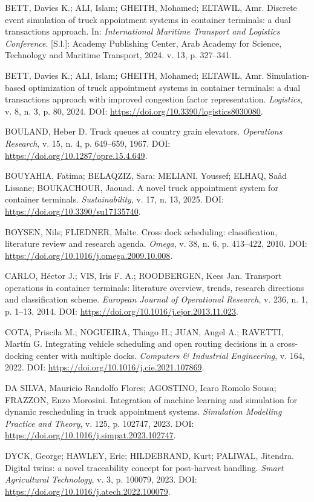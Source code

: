 \documentclass[
  12pt,
  oneside,
  a4paper,
  sumario=tradicional,
  brazil
]{abntex2}
\begin{document}
BETT, Davies K.; ALI, Islam; GHEITH, Mohamed; ELTAWIL, Amr. Discrete event simulation of truck appointment systems in container terminals: a dual transactions approach. In: \textit{International Maritime Transport and Logistics Conference}. [S.l.]: Academy Publishing Center, Arab Academy for Science, Technology and Maritime Transport, 2024. v. 13, p. 327--341.

BETT, Davies K.; ALI, Islam; GHEITH, Mohamed; ELTAWIL, Amr. Simulation-based optimization of truck appointment systems in container terminals: a dual transactions approach with improved congestion factor representation. \textit{Logistics}, v. 8, n. 3, p. 80, 2024. DOI: \url{https://doi.org/10.3390/logistics8030080}.

BOULAND, Heber D. Truck queues at country grain elevators. \textit{Operations Research}, v. 15, n. 4, p. 649--659, 1967. DOI: \url{https://doi.org/10.1287/opre.15.4.649}.

BOUYAHIA, Fatima; BELAQZIZ, Sara; MELIANI, Youssef; ELHAQ, Sa\^ad Lissane; BOUKACHOUR, Jaouad. A novel truck appointment system for container terminals. \textit{Sustainability}, v. 17, n. 13, 2025. DOI: \url{https://doi.org/10.3390/su17135740}.

BOYSEN, Nils; FLIEDNER, Malte. Cross dock scheduling: classification, literature review and research agenda. \textit{Omega}, v. 38, n. 6, p. 413--422, 2010. DOI: \url{https://doi.org/10.1016/j.omega.2009.10.008}.

CARLO, H\'ector J.; VIS, Iris F. A.; ROODBERGEN, Kees Jan. Transport operations in container terminals: literature overview, trends, research directions and classification scheme. \textit{European Journal of Operational Research}, v. 236, n. 1, p. 1--13, 2014. DOI: \url{https://doi.org/10.1016/j.ejor.2013.11.023}.

COTA, Priscila M.; NOGUEIRA, Thiago H.; JUAN, Angel A.; RAVETTI, Mart\'in G. Integrating vehicle scheduling and open routing decisions in a cross-docking center with multiple docks. \textit{Computers \& Industrial Engineering}, v. 164, 2022. DOI: \url{https://doi.org/10.1016/j.cie.2021.107869}.

DA SILVA, Mauricio Randolfo Flores; AGOSTINO, Icaro Romolo Sousa; FRAZZON, Enzo Morosini. Integration of machine learning and simulation for dynamic rescheduling in truck appointment systems. \textit{Simulation Modelling Practice and Theory}, v. 125, p. 102747, 2023. DOI: \url{https://doi.org/10.1016/j.simpat.2023.102747}.

DYCK, George; HAWLEY, Eric; HILDEBRAND, Kurt; PALIWAL, Jitendra. Digital twins: a novel traceability concept for post-harvest handling. \textit{Smart Agricultural Technology}, v. 3, p. 100079, 2023. DOI: \url{https://doi.org/10.1016/j.atech.2022.100079}.
\end{document}
